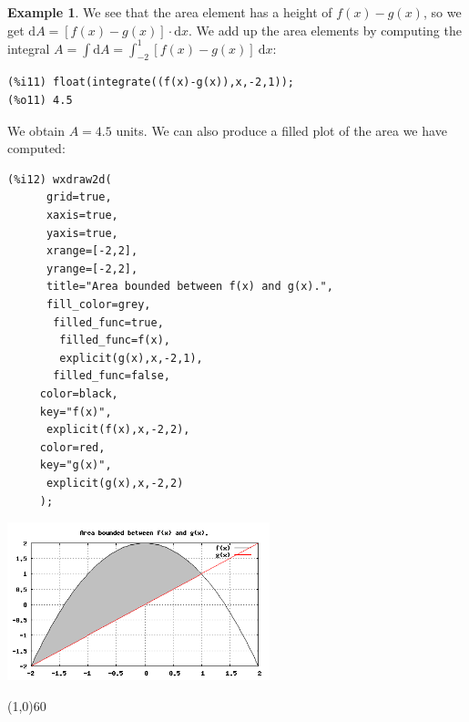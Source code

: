\documentclass[10.5pt,twoside]{report}
\theoremstyle{definition}
\newtheorem{exmp}{Example}[section]
\begin{document}
\begin{exmp}
We see that the area element has a height of $f(x)-g(x)$, so we get $\mathrm{d}A=[f(x)-g(x)]\cdot \mathrm{d}x$.  We add up the area elements by computing the integral $A=\displaystyle \int  \mathrm{d}A=\displaystyle \int_{-2}^{1} [f(x)-g(x)]\ \mathrm{d}x $:

\begin{verbatim}
(%i11) float(integrate((f(x)-g(x)),x,-2,1));
(%o11) 4.5
\end{verbatim}

We obtain $A=4.5$ units.  We can also produce a filled plot of the area we have computed:

\begin{verbatim}
(%i12) wxdraw2d(
      grid=true,
      xaxis=true,
      yaxis=true,
      xrange=[-2,2],
      yrange=[-2,2],
      title="Area bounded between f(x) and g(x).",
      fill_color=grey,
       filled_func=true,
        filled_func=f(x),
        explicit(g(x),x,-2,1),
       filled_func=false,
     color=black,
     key="f(x)",
      explicit(f(x),x,-2,2),
     color=red,
     key="g(x)",
      explicit(g(x),x,-2,2)
     );
\end{verbatim}

\includegraphics[width=3in]{example_7_3_1_2_3}

\end{exmp}

\line(1,0){60}
\linethickness{0.5mm}
\end{document}
